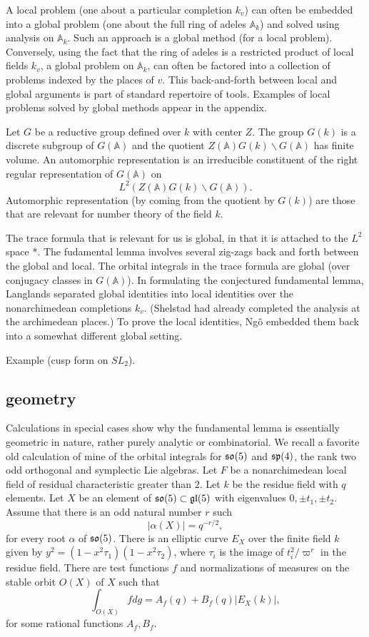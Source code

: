 \documentclass[brochure,english,12pt]{bourbaki}
\newcommand{\ring}[1]{\mathbb{#1}}
\def\AD{\ring{A}}
\def\so{\frak{so}}
\def\sp{\frak{sp}}
\def\gl{\frak{gl}}
\begin{document}
A local problem (one about a particular completion $k_v$) can often be
embedded into a global problem (one about the full ring of adeles
$\AD_k$) and solved using analysis on $\AD_k$.  Such an approach is a
global method (for a local problem).  Conversely, using the fact that
the ring of adeles is a restricted product of local fields $k_v$, a
global problem on $\AD_k$, can often be factored into a collection of
problems indexed by the places of $v$.  This back-and-forth between
local and global arguments is part of standard repertoire of tools.
Examples of local problems solved by global methods appear in the
appendix.


Let $G$ be a reductive group defined over $k$ with center $Z$.  The
group $G(k)$ is a discrete subgroup of $G(\AD)$ and the quotient
$Z(\AD)G(k)\backslash G(\AD)$ has finite volume.  An automorphic
representation is an irreducible constituent of the right regular
representation of $G(\AD)$ on 
\[
L^2(Z(\AD) G(k)\backslash G(\AD)).
\]
Automorphic representation (by coming from the quotient by $G(k)$) are
those that are relevant for number theory of the field $k$.

The trace formula that is relevant for us is global, in that it is
attached to the $L^2$ space *.  The fudamental lemma involves several
zig-zags back and forth between the global and local.  The orbital
integrals in the trace formula are global (over conjugacy classes in
$G(\AD)$).  In formulating the conjectured fundamental lemma, Langlands
separated global identities into local identities over the
nonarchimedean completions $k_v$.  (Shelstad had already completed the
analysis at the archimedean places.)  To prove the local identities,
Ng\^o embedded them back into a somewhat different global setting.

Example (cusp form on $SL_2$).


\subsection{geometry}

Calculations in special cases show why
the fundamental lemma is essentially geometric in nature, rather purely analytic
or combinatorial. We recall a favorite old calculation of mine
of the orbital integrals for $\so(5)$ and $\sp(4)$, the rank two odd orthogonal
and symplectic Lie algebras.  Let $F$ be a
nonarchimedean local field of residual characteristic greater than
$2$.  Let $k$ be the residue field with $q$ elements.  Let $X$ be an
element of $\so(5)\subset \gl(5)$ with eigenvalues $0,\pm t_1,\pm
t_2$.  Assume that there is an odd natural number $r$ such
\[
|\alpha(X)| = q^{-r/2},
\]
for every root $\alpha$ of $\so(5)$. 
There is an elliptic curve $E_X$ over the finite field $k$ given by
$y^2 = (1-x^2\tau_1)(1-x^2\tau_2)$, where $\tau_i$ is the image
of $t_i^2/\varpi^r$ in the residue field.  There are test functions $f$ and normalizations of
measures on the stable orbit $O(X)$ of $X$ such that
\begin{equation}\label{eqn:elliptic}
\int_{O(X)} f dg = A_f(q) + B_f(q) | E_X(k)|,
\end{equation}
for some rational functions $A_f,B_f$.
\end{document}
